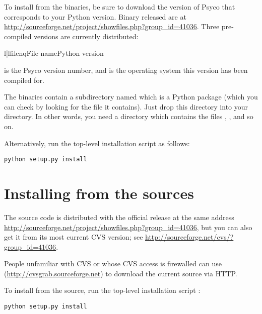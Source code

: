\documentclass{manual}
\begin{document}
To install from the binaries, be sure to download the version of Psyco that corresponds to your Python version.  Binary released are at \url{http://sourceforge.net/project/showfiles.php?group_id=41036}.  Three pre-compiled versions are currently distributed:

\begin{tableii}{l|l}{filenq}{File name}{Python version}
\end{tableii}

 is the Psyco version number, and  is the operating system this version has been compiled for.

The binaries contain a subdirectory named  which is a Python package (which you can check by looking for the  file it contains).  Just drop this directory into your  directory.  In other words, you need a directory  which contains the files , , and so on.

Alternatively, run the top-level installation script  as follows:

\begin{verbatim}
python setup.py install
\end{verbatim}


\section{Installing from the sources}\label{sources}

The source code is distributed with the official release at the same address \url{http://sourceforge.net/project/showfiles.php?group_id=41036}, but you can also get it from its most current CVS version; see \url{http://sourceforge.net/cvs/?group_id=41036}.

People unfamiliar with CVS or whose CVS access is firewalled can use  (\url{http://cvsgrab.sourceforge.net}) to download the current source via HTTP.

To install from the source, run the top-level installation script :

\begin{verbatim}
python setup.py install
\end{verbatim}
\end{document}
